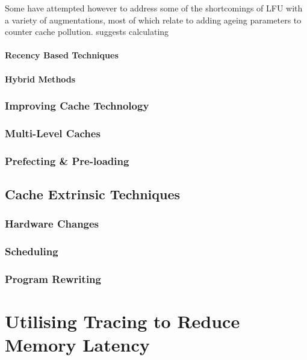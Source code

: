 Some have attempted however to address some of the shortcomings of LFU with a variety of augmentations, most of which relate to adding ageing parameters to counter cache pollution. \citet{arlittEvaluatingContentManagement2000} suggests calculating 

\subsubsection{Recency Based Techniques}

\subsubsection{Hybrid Methods}

\subsection{Improving Cache Technology}

\subsection{Multi-Level Caches}

\subsection{Prefecting \& Pre-loading}

\section{Cache Extrinsic Techniques}

\subsection{Hardware Changes}

\subsection{Scheduling}

\subsection{Program Rewriting}

\chapter{Utilising Tracing to Reduce Memory Latency}

